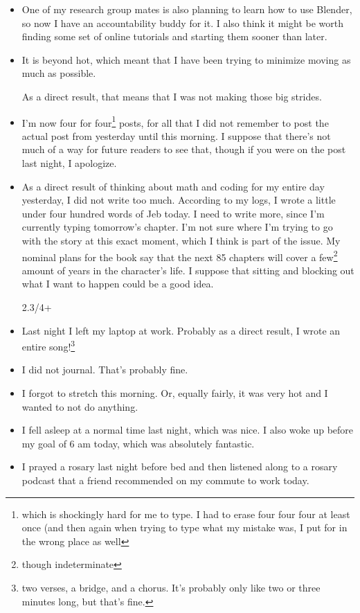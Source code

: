 \documentclass[12pt]{article}[titlepage]
\newcommand{\1}{\={a}}
\newcommand{\2}{\={e}}
\newcommand{\3}{\={\i}}
\newcommand{\4}{\=o}
\newcommand{\5}{\=u}
\newcommand{\6}{\={A}}
\renewcommand{\,}{\textsuperscript{,}}
\begin{document}
\begin{itemize}
\item One of my research group mates is also planning to learn how to use Blender, so now I have an accountability buddy for it.
I also think it might be worth finding some set of online tutorials and starting them sooner than later.

\item It is beyond hot, which meant that I have been trying to minimize moving as much as possible. 

As a direct result, that means that I was not making those big strides.

\item I'm now four for four\footnote{which is shockingly hard for me to type. I had to erase four four four at least once (and then again when trying to type what my mistake was, I put for in the wrong place as well} posts, for all that I did not remember to post the actual post from yesterday until this morning.
I suppose that there's not much of a way for future readers to see that, though if you were on the post last night, I apologize.

\item As a direct result of thinking about math and coding for my entire day yesterday, I did not write too much. According to my logs, I wrote a little under four hundred words of Jeb today. I need to write more, since I'm currently typing tomorrow's chapter.
I'm not sure where I'm trying to go with the story at this exact moment, which I think is part of the issue.
My nominal plans for the book say that the next 85 chapters will cover a few\footnote{though indeterminate} amount of years in the character's life.
I suppose that sitting and blocking out what I want to happen could be a good idea.

2.3/4+
\item Last night I left my laptop at work.
Probably as a direct result, I wrote an entire song!\footnote{two verses, a bridge, and a chorus.
It's probably only like two or three minutes long, but that's fine.}

\item I did not journal. That's probably fine.

\item I forgot to stretch this morning.
Or, equally fairly, it was very hot and I wanted to not do anything.

\item I fell asleep at a normal time last night, which was nice. I also woke up before my goal of 6 am today, which was absolutely fantastic.

\item I prayed a rosary last night before bed and then listened along to a rosary podcast that a friend recommended on my commute to work today.

\end{itemize}
\end{document}
